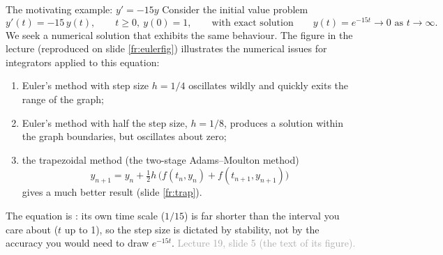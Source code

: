 \documentclass[aspectratio=169,11pt]{beamer}
\newcommand{\sourcecredit}[1]{\vfill\hfill{\tiny\textcolor{DarkGray}{#1}}}
\begin{document}
\begin{frame}{The motivating example: $y' = -15y$}
\label{fr:motivate}
\small
Consider the initial value problem
\[ y'(t) = -15\,y(t), \qquad t \ge 0,\ y(0) = 1, \qquad\text{with exact solution}\qquad y(t) = e^{-15t} \to 0 \text{ as } t \to \infty. \]
We seek a numerical solution that exhibits the same behaviour. The figure in the lecture (reproduced on slide \ref{fr:eulerfig}) illustrates the numerical issues for integrators applied to this equation:
\begin{enumerate}
  \item Euler's method with step size $h = 1/4$ oscillates wildly and quickly exits the range of the graph;
  \item Euler's method with half the step size, $h = 1/8$, produces a solution within the graph boundaries, but oscillates about zero;
  \item the trapezoidal method (the two-stage Adams--Moulton method)
  \[ y_{n+1} = y_n + \tfrac12 h\,\big(f(t_n, y_n) + f(t_{n+1}, y_{n+1})\big) \]
  gives a much better result (slide \ref{fr:trap}).
\end{enumerate}
The equation is : its own time scale ($1/15$) is far shorter than the interval you care about ($t$ up to 1), so the step size is dictated by stability, not by the accuracy you would need to draw $e^{-15t}$.
\sourcecredit{Lecture 19, slide 5 (the text of its figure).}
\end{frame}
\end{document}
